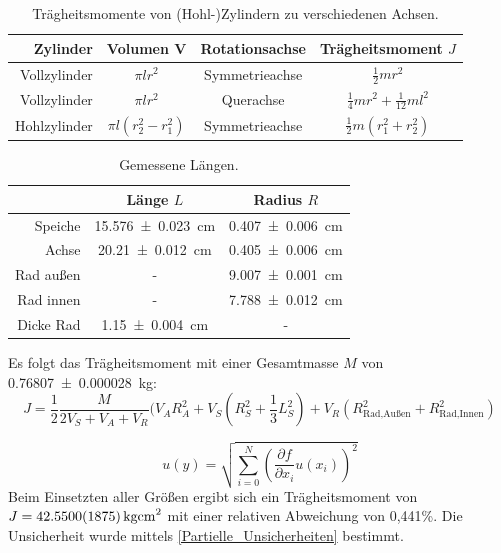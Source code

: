 \documentclass[
	a4paper,
	12pt,
	pagesize,
	ngerman
]{scrartcl}
\begin{document}
	\begin{table}[tb]
		\centering
		\begin{tabular}{ r |  c | c | c}
			Zylinder& Volumen V &Rotationsachse & Trägheitsmoment $J$\\ \hline
			Vollzylinder& $\pi lr^2$ &Symmetrieachse & $\frac{1}{2} m r^2$ \\
			Vollzylinder& $\pi lr^2$&Querachse & $\frac{1}{4} m r^2 + \frac{1}{12} m l^2$ \\
			Hohlzylinder& $\pi l(r_2^2 - r_1^2)$&Symmetrieachse & $\frac{1}{2} m (r_1^2 + r_2^2)$ \\
		\end{tabular}
		\caption{Trägheitsmomente von (Hohl-)Zylindern zu verschiedenen Achsen.}
		\label{Tabelle_Traegheitsmomente_Zylinder} 
	\end{table}

	\begin{table}[tb]
		\centering
		\begin{tabular}{ r |  c | c }
			& Länge $L$ & Radius $R$\\ \hline
			Speiche &\SI{15,576\pm 0,023}{cm} & \SI{0,407\pm0,006}{cm}\\
			Achse & \SI{20,21\pm0,012}{cm} & \SI{0,405\pm0,006}{cm}\\
			Rad außen&- & \SI{9,007\pm0,001}{cm} \\
			Rad innen&- & \SI{7,788\pm0,012}{cm} \\
			Dicke Rad & \SI{1,15\pm0,004}{cm} & -
		\end{tabular}
		\caption{ Gemessene Längen.}
		\label{Tabelle_Laenge} 
	\end{table}
	Es folgt das Trägheitsmoment mit einer Gesamtmasse $M$ von \SI{0,76807 \pm 0,000028}{kg}:
	\begin{equation}
		J = \frac{1}{2}\frac{M}{2V_S+V_A+V_R} ( V_A R_A^2 + V_S (R_S^2 + \frac{1}{3} L_S^2) + V_R (R_\text{Rad,Außen}^2 + R_\text{Rad,Innen}^2)
	\end{equation}

	\begin{equation}
		u(y) = \sqrt{  \sum_{i=0}^{N} \left( \frac{\partial f}{\partial x_i}u(x_i)\right)^2  }
		\label{Partielle_Unsicherheiten}
	\end{equation}
	Beim Einsetzten aller Größen ergibt sich ein Trägheitsmoment von $J = \SI{42.550 \pm 0,1875}{kg cm^2}$ mit einer relativen Abweichung von 0,441\%. Die Unsicherheit wurde mittels \cref{Partielle_Unsicherheiten} bestimmt. %
\end{document}

